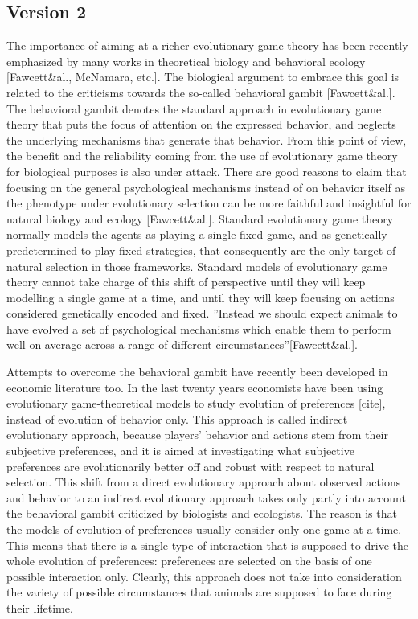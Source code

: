\documentclass[fleqn,reqno,11pt]{article}
\begin{document}
\subsection{Version 2}

The importance of aiming at a richer evolutionary game theory has been recently emphasized by many works in theoretical biology and behavioral ecology [Fawcett\&al., McNamara, etc.]. The biological argument to embrace this goal is related to the criticisms towards the so-called behavioral gambit [Fawcett\&al.]. The behavioral gambit denotes the standard approach in evolutionary game theory that puts the focus of attention on the expressed behavior, and neglects the underlying mechanisms that generate that behavior. From this point of view, the benefit and the reliability coming from the use of evolutionary game theory for biological purposes is also under attack. There are good reasons to claim that focusing on the general psychological mechanisms instead of on behavior itself as the phenotype under evolutionary selection can be more faithful and insightful for natural biology and ecology [Fawcett\&al.].
Standard evolutionary game theory normally models the agents as playing a single fixed game, and as genetically predetermined to play fixed strategies, that consequently are the only target of natural selection in those frameworks. Standard models of evolutionary game theory cannot take charge of this shift of perspective until they will keep modelling a single game at a time, and until they will keep focusing on actions considered genetically encoded and fixed. ''Instead we should expect animals to have evolved a set of psychological mechanisms which enable them to perform well on average across a range of different circumstances''[Fawcett\&al.].

Attempts to overcome the behavioral gambit have recently been developed in economic literature too. In the last twenty years economists have been using evolutionary game-theoretical models to study evolution of preferences [cite], instead of evolution of behavior only. This approach is called indirect evolutionary approach, because players' behavior and actions stem from their subjective preferences, and it is aimed at investigating what subjective preferences are evolutionarily better off and robust with respect to natural selection. This shift from a direct evolutionary approach about observed actions and behavior to an indirect evolutionary approach takes only partly into account the behavioral gambit criticized by biologists and ecologists. The reason is that the models of evolution of preferences usually consider only one game at a time. This means that there is a single type of interaction that is supposed to drive the whole evolution of preferences: preferences are selected on the basis of one possible interaction only. Clearly, this approach does not take into consideration the variety of possible circumstances that animals are supposed to face during their lifetime. 
\end{document}
